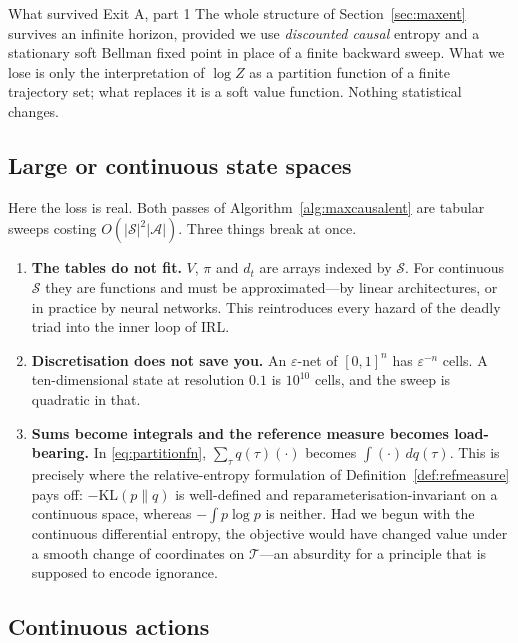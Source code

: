 \documentclass[11pt]{article}
\theoremstyle{plain}
\theoremstyle{definition}
\theoremstyle{remark}
\renewcommand{\S}{\mathcal{S}}
\newcommand{\A}{\mathcal{A}}
\newcommand{\T}{\mathcal{T}}
\newcommand{\KL}{\mathrm{KL}}
\begin{document}
\begin{graybox}{What survived Exit A, part 1}
The whole structure of Section~\ref{sec:maxent} survives an infinite
horizon, provided we use \emph{discounted causal} entropy and a stationary
soft Bellman fixed point in place of a finite backward sweep. What we lose
is only the interpretation of $\log Z$ as a partition function of a finite
trajectory set; what replaces it is a soft value function. Nothing
statistical changes.
\end{graybox}

\subsection{Large or continuous state spaces}

Here the loss is real. Both passes of Algorithm~\ref{alg:maxcausalent} are
tabular sweeps costing $O(|\S|^2|\A|)$. Three things break at once.

\begin{enumerate}
\item \textbf{The tables do not fit.} $V$, $\pi$ and $d_t$ are arrays
indexed by $\S$. For continuous $\S$ they are functions and must be
approximated---by linear architectures, or in practice by neural
networks. This reintroduces every hazard of the deadly triad into the
inner loop of IRL.
\item \textbf{Discretisation does not save you.} An $\varepsilon$-net of
$[0,1]^n$ has $\varepsilon^{-n}$ cells. A ten-dimensional state at
resolution $0.1$ is $10^{10}$ cells, and the sweep is quadratic in that.
\item \textbf{Sums become integrals and the reference measure becomes
load-bearing.} In \eqref{eq:partitionfn}, $\sum_\tau q(\tau)(\cdot)$
becomes $\int(\cdot)\,dq(\tau)$. This is precisely where the
relative-entropy formulation of Definition~\ref{def:refmeasure} pays off:
$-\KL(p\|q)$ is well-defined and reparameterisation-invariant on a
continuous space, whereas $-\int p\log p$ is neither. Had we begun with
the continuous differential entropy, the objective would have changed
value under a smooth change of coordinates on $\T$---an absurdity for a
principle that is supposed to encode ignorance.
\end{enumerate}

\subsection{Continuous actions}
\end{document}
